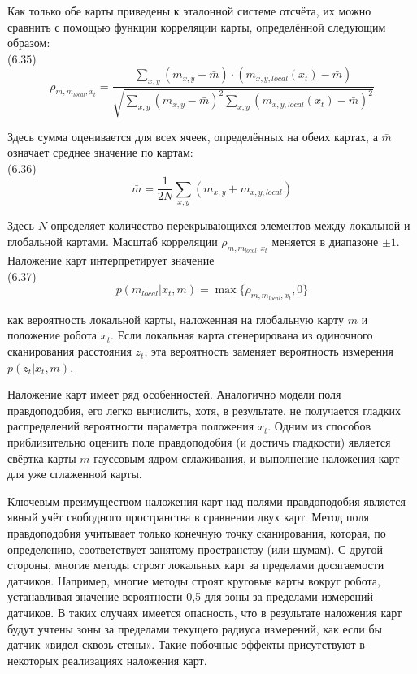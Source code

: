 \documentclass[10pt,a4paper]{article}
\begin{document}
Как только обе карты приведены к эталонной системе отсчёта, их можно сравнить с помощью функции корреляции карты, определённой следующим образом:\\

(6.35)
$$\rho_{m,m_{local},x_t}=\frac{\sum_{x,y}(m_{x,y}-\bar{m})\cdot(m_{x,y,local}(x_t)-\bar{m})}{\sqrt{\sum_{x,y}(m_{x,y}-\bar{m})^2\sum_{x,y}(m_{x,y,local}(x_t)-\bar{m})^2}}$$

Здесь сумма оценивается для всех ячеек, определённых на обеих картах, а $\bar{m}$ означает среднее значение по картам:\\

(6.36)
$$\bar{m}=\frac{1}{2N}\sum_{x,y}(m_{x,y}+m_{x,y,local})$$

Здесь $N$ определяет количество перекрывающихся элементов между локальной и глобальной картами.  Масштаб корреляции $\rho_{m,m_{local},x_t}$ меняется в диапазоне  $\pm1$. Наложение карт интерпретирует значение\\

(6.37)
$$p(m_{local}|x_t,m)=\max\{\rho_{m,m_{local},x_t},0\}$$

как вероятность локальной карты, наложенная на глобальную карту $m$ и положение робота $x_t$. Если локальная карта сгенерирована из одиночного сканирования расстояния $z_t$, эта вероятность заменяет вероятность измерения $p(z_t | x_t, m)$.

Наложение карт имеет ряд особенностей. Аналогично модели поля правдоподобия, его легко вычислить, хотя, в результате, не получается гладких распределений вероятности параметра положения $x_t$. Одним из способов приблизительно оценить поле правдоподобия (и достичь гладкости) является свёртка карты $m$ гауссовым ядром сглаживания, и выполнение наложения карт для уже сглаженной карты.

Ключевым преимуществом наложения карт над полями правдоподобия является явный учёт свободного пространства в сравнении двух карт. Метод поля правдоподобия учитывает только конечную точку сканирования, которая, по определению, соответствует занятому пространству (или шумам). С другой стороны, многие методы строят локальных карт за пределами досягаемости датчиков. Например, многие методы строят круговые карты вокруг робота, устанавливая значение вероятности 0,5 для зоны за пределами измерений датчиков. В таких случаях имеется опасность, что в результате наложения карт будут учтены зоны за пределами текущего радиуса измерений, как если бы датчик «видел сквозь стены». Такие побочные эффекты присутствуют в некоторых реализациях наложения карт.
\end{document}
